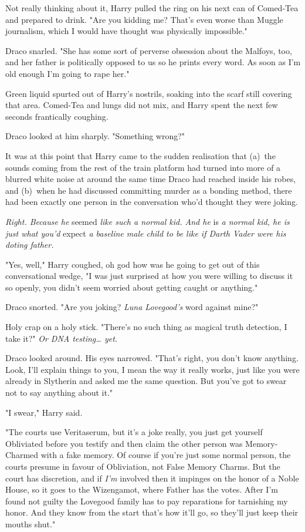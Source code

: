Not really thinking about it, Harry pulled the ring on his next can of
Comed-Tea and prepared to drink. "Are you kidding me? That's even worse than
Muggle journalism, which I would have thought was physically impossible."

Draco snarled. "She has some sort of perverse obsession about the Malfoys, too,
and her father is politically opposed to us so he prints every word. As soon as
I'm old enough I'm going to rape her."

Green liquid spurted out of Harry's nostrils, soaking into the scarf still
covering that area. Comed-Tea and lungs did not mix, and Harry spent the next
few seconds frantically coughing.

Draco looked at him sharply. "Something wrong?"

It was at this point that Harry came to the sudden realisation that (a)~the
sounds coming from the rest of the train platform had turned into more of a
blurred white noise at around the same time Draco had reached inside his robes,
and (b)~when he had discussed committing murder as a bonding method, there had
been exactly one person in the conversation who'd thought they were joking.

\emph{Right. Because he} seemed \emph{like such a normal kid. And he} is \emph{a
normal kid, he is just what you'd} expect \emph{a baseline male child to be
like if Darth Vader were his doting father.}

"Yes, well," Harry coughed, oh god how was he going to get out of this
conversational wedge, "I was just surprised at how you were willing to discuss
it so openly, you didn't seem worried about getting caught or anything."

Draco snorted. "Are you joking? \emph{Luna Lovegood's} word against mine?"

Holy crap on a holy stick. "There's no such thing as magical truth detection, I
take it?" \emph{Or DNA testing{\ldots} yet.}

Draco looked around. His eyes narrowed. "That's right, you don't know anything.
Look, I'll explain things to you, I mean the way it really works, just like you
were already in Slytherin and asked me the same question. But you've got to
swear not to say anything about it."

"I swear," Harry said.

"The courts use Veritaserum, but it's a joke really, you just get yourself
Obliviated before you testify and then claim the other person was
Memory-Charmed with a fake memory. Of course if you're just some normal person,
the courts presume in favour of Obliviation, not False Memory Charms. But the
court has discretion, and if \emph{I'm} involved then it impinges on the honor
of a Noble House, so it goes to the Wizengamot, where Father has the votes.
After I'm found not guilty the Lovegood family has to pay reparations for
tarnishing my honor. And they know from the start that's how it'll go, so
they'll just keep their mouths shut."

